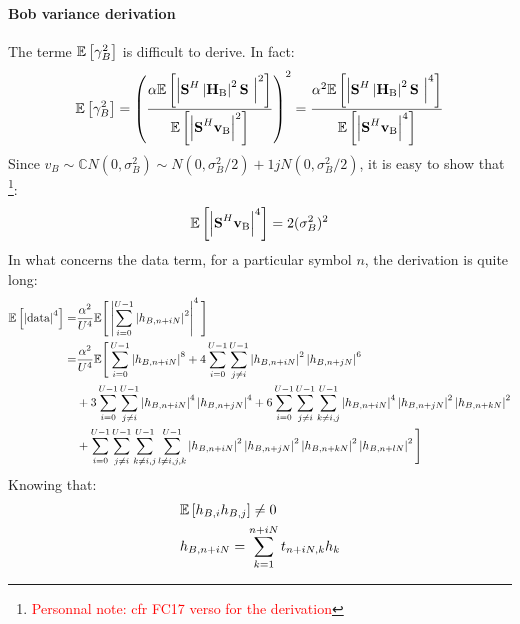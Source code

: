 \documentclass[12pt]{article}
\begin{document}
\paragraph*{Bob variance derivation}
The terme $\mathbb{E} \left[\gamma_B^2\right]$ is difficult to derive. In fact:
\begin{equation}
	\mathbb{E} \left[\gamma_B^2\right] = \left( \frac{\alpha\mathbb{E} \left[\left| \textbf{S}^H  \left|\textbf{H}_{\text{B}}\right|^2\textbf{S}\ \right|^2\right]}{ \mathbb{E} \left[\left|  \textbf{S}^H \textbf{v}_\text{B}\right|^2\right]}\right)^2 = \frac{\alpha^2 \mathbb{E} \left[\left| \textbf{S}^H  \left|\textbf{H}_{\text{B}}\right|^2\textbf{S}\ \right|^4\right]}{\mathbb{E} \left[\left|  \textbf{S}^H \textbf{v}_\text{B}\right|^4\right]}
	\label{eq:sinrB_exp4}
\end{equation} 
Since $v_B \sim \mathbb{C}N(0,\sigma_B^2) \sim N(0,\sigma_B^2/2) + 1j N(0,\sigma_B^2/2)$, it is easy to show that \footnote{\textcolor{red}{Personnal note: cfr FC17 verso for the derivation}}:
\begin{equation}
	\mathbb{E} \left[\left|  \textbf{S}^H \textbf{v}_\text{B}\right|^4\right] = 2(\sigma_B^2)^2
	\label{eq:noisB_exp4}
\end{equation}
In what concerns the data term, for a particular symbol $n$, the derivation is quite long:
\begin{equation}
\begin{split}
	\mathbb{E} \left[\left|\text{data}\right|^4\right] = &\frac{\alpha^2}{U^4} \mathbb{E}\Bigg[ \left|\sum_{i=0}^{U-1}\left|h_{B,n+iN}\right|^2\right|^4\Bigg] \\
	= &\frac{\alpha^2}{U^4} \mathbb{E}\Bigg[ \sum_{i=0}^{U-1} \left|h_{B,n+iN}\right|^8 + 4 \sum_{i=0}^{U-1} \sum_{j \neq i}^{U-1} \left|h_{B,n+iN}\right|^2\left|h_{B,n+jN}\right|^6 \\
	& + 3 \sum_{i=0}^{U-1} \sum_{j \neq i}^{U-1} \left|h_{B,n+iN}\right|^4\left|h_{B,n+jN}\right|^4 + 6 \sum_{i=0}^{U-1} \sum_{j \neq i}^{U-1} \sum_{k \neq i,j}^{U-1} \left|h_{B,n+iN}\right|^4\left|h_{B,n+jN}\right|^2  \left|h_{B,n+kN}\right|^2 \\ 
	& + \sum_{i=0}^{U-1} \sum_{j \neq i}^{U-1} \sum_{k \neq i,j}^{U-1}   \sum_{l \neq i,j,k}^{U-1} \left|h_{B,n+iN}\right|^2\left|h_{B,n+jN}\right|^2  \left|h_{B,n+kN}\right|^2   \left|h_{B,n+lN}\right|^2\Bigg] 
\end{split}
\label{eq:dataB_exp4}
\end{equation}
Knowing that:
\begin{equation}
	\begin{split}
		&\mathbb{E} \left[h_{B,i} h_{B,j} \right] \neq 0 \\
		& h_{B,n+iN} = \sum_{k = 1}^{n+iN} t_{n+iN,k} h_k
	\end{split}
\end{equation}
\end{document}
